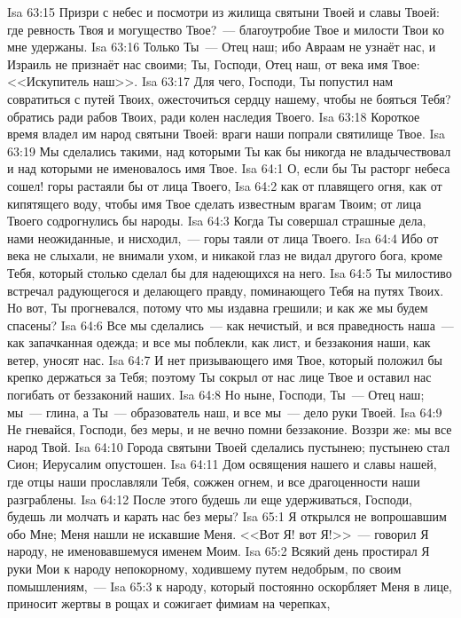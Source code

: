 \vs Isa 63:15 Призри с небес и посмотри из жилища святыни Твоей и славы Твоей: где ревность Твоя и могущество Твое?~--- благоутробие Твое и милости Твои ко мне удержаны.
\vs Isa 63:16 Только Ты~--- Отец наш; ибо Авраам не узнаёт нас, и Израиль не признаёт нас своими; Ты, Господи, Отец наш, от века имя Твое: <<Искупитель наш>>.
\vs Isa 63:17 Для чего, Господи, Ты попустил нам совратиться с путей Твоих, ожесточиться сердцу нашему, чтобы не бояться Тебя? обратись ради рабов Твоих, ради колен наследия Твоего.
\vs Isa 63:18 Короткое время владел им народ святыни Твоей: враги наши попрали святилище Твое.
\vs Isa 63:19 Мы сделались такими, над которыми Ты как бы никогда не владычествовал и над которыми не именовалось имя Твое.
\vs Isa 64:1 О, если бы Ты расторг небеса  сошел! горы растаяли бы от лица Твоего,
\vs Isa 64:2 как от плавящего огня, как от кипятящего воду, чтобы имя Твое сделать известным врагам Твоим; от лица Твоего содрогнулись бы народы.
\vs Isa 64:3 Когда Ты совершал страшные дела, нами неожиданные, и нисходил,~--- горы таяли от лица Твоего.
\vs Isa 64:4 Ибо от века не слыхали, не внимали ухом, и никакой глаз не видал другого бога, кроме Тебя, который столько сделал бы для надеющихся на него.
\vs Isa 64:5 Ты милостиво встречал радующегося и делающего правду, поминающего Тебя на путях Твоих. Но вот, Ты прогневался, потому что мы издавна грешили; и как же мы будем спасены?
\vs Isa 64:6 Все мы сделались~--- как нечистый, и вся праведность наша~--- как запачканная одежда; и все мы поблекли, как лист, и беззакония наши, как ветер, уносят нас.
\vs Isa 64:7 И нет призывающего имя Твое, который положил бы крепко держаться за Тебя; поэтому Ты сокрыл от нас лице Твое и оставил нас погибать от беззаконий наших.
\vs Isa 64:8 Но ныне, Господи, Ты~--- Отец наш; мы~--- глина, а Ты~--- образователь наш, и все мы~--- дело руки Твоей.
\vs Isa 64:9 Не гневайся, Господи, без меры, и не вечно помни беззаконие. Воззри же: мы все народ Твой.
\vs Isa 64:10 Города святыни Твоей сделались пустынею; пустынею стал Сион; Иерусалим опустошен.
\vs Isa 64:11 Дом освящения нашего и славы нашей, где отцы наши прославляли Тебя, сожжен огнем, и все драгоценности наши разграблены.
\vs Isa 64:12 После этого будешь ли еще удерживаться, Господи, будешь ли молчать и карать нас без меры?
\vs Isa 65:1 Я открылся не вопрошавшим обо Мне; Меня нашли не искавшие Меня. <<Вот Я! вот Я!>>~--- говорил Я народу, не именовавшемуся именем Моим.
\vs Isa 65:2 Всякий день простирал Я руки Мои к народу непокорному, ходившему путем недобрым, по своим помышлениям,~---
\vs Isa 65:3 к народу, который постоянно оскорбляет Меня в лице, приносит жертвы в рощах и сожигает фимиам на черепках,
